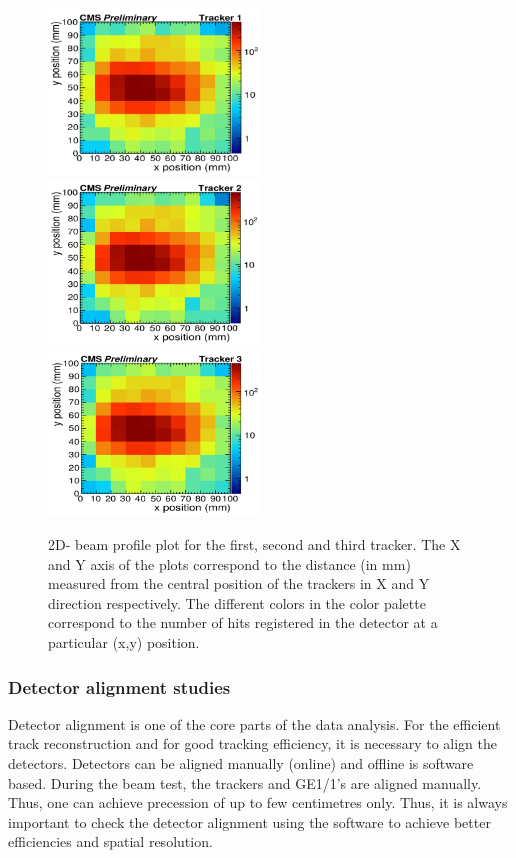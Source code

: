 \begin{figure}[!htbp]
\centering
\includegraphics[width=0.5\textwidth]{figures/GEM/Selection_027.png}%
\includegraphics[width=0.5\textwidth]{figures/GEM/Selection_028.png}\\
\includegraphics[width=0.5\textwidth]{figures/GEM/Selection_029.png}
\caption{2D- beam profile plot for the first, second and third tracker. The X and Y axis of the plots correspond to the distance (in mm) measured from the central position of the trackers in X and Y direction respectively. The different colors in the color palette correspond to the number of hits registered in the detector at a particular (x,y) position.}\label{BeamProfile}
\end{figure}

\subsubsection{Detector alignment studies}
Detector alignment is one of the core parts of the data analysis. 
For the efficient track reconstruction and for good tracking efficiency, it is necessary to align the detectors. Detectors can be aligned manually (online) and offline is software based.
During the beam test, the trackers and GE1/1's are aligned manually. Thus, one can achieve precession of up to few centimetres only.
Thus, it is always important to check the detector alignment using the software to achieve better efficiencies and spatial resolution.

